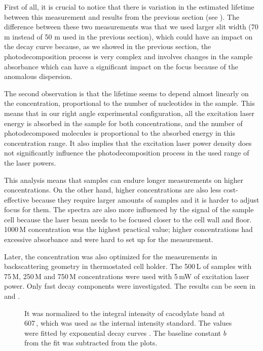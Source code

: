 First of all, it is crucial to notice that there is variation in the
estimated lifetime between this measurement and results from the previous
section (see
).
The difference between these two measurements was that we used larger slit
width (70 m instead of 50 m used in the previous section), which
could have an impact on the decay curve because, as we showed in the previous
section, the photodecomposition process is very complex and involves changes in
the sample absorbance which can have a significant impact on the focus because
of the anomalous dispersion.

The second observation is that the lifetime seems to depend almost linearly on
the concentration, proportional to the number of nucleotides in the sample.
This means that in our right angle experimental configuration, all the
excitation laser energy is absorbed in the sample for both concentrations, and
the number of photodecomposed molecules is proportional to the absorbed
energy in this concentration range.
It also implies that the excitation laser power density does not significantly
influence the photodecomposition process in the used range of the laser powers.

This analysis means that samples can endure longer measurements on higher
concentrations.
On the other hand, higher concentrations are also less cost-effective because
they require larger amounts of samples and it is harder to adjust focus for
them.
The spectra are also more influenced by the signal of the sample cell
because the laser beam needs to be focused closer to the cell wall and floor.
1000\,M concentration was the highest practical value; higher
concentrations had excessive absorbance and were hard to set up for the measurement.

Later, the concentration was also optimized for the measurements in
backscattering geometry in thermostated cell holder.
The 500\,L of samples with 75\,M, 250\,M and 750\,M
concentrations were used with 5\,mW of excitation laser power.
Only fast decay components were investigated.
The results can be seen in
and
.

\begin{figure}
	\centering
	
	\caption[%
		Decrease of the integral intensity of the polyU band at 1231\,\icm{}
		for different concentrations in raw spectra using
		backscattering geometry.%
	]{%
		It was normalized to the integral intensity of cacodylate band at
		607\,\icm{}, which was used as the internal intensity standard.
		The values were fitted	by exponential decay curves
		.
		The baseline constant $b$ from the fit was subtracted from the plots.
	}
	\label{\figlabel{conc_optim:hairpins}}
\end{figure}


